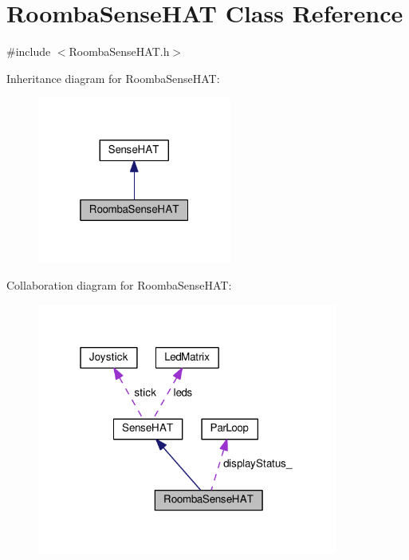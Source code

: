 \hypertarget{class_roomba_sense_h_a_t}{}\section{Roomba\+Sense\+H\+AT Class Reference}
\label{class_roomba_sense_h_a_t}


{\ttfamily \#include $<$Roomba\+Sense\+H\+A\+T.\+h$>$}



Inheritance diagram for Roomba\+Sense\+H\+AT\+:\nopagebreak
\begin{figure}[H]
\begin{center}
\leavevmode
\includegraphics[width=181pt]{class_roomba_sense_h_a_t__inherit__graph}
\end{center}
\end{figure}


Collaboration diagram for Roomba\+Sense\+H\+AT\+:\nopagebreak
\begin{figure}[H]
\begin{center}
\leavevmode
\includegraphics[width=280pt]{class_roomba_sense_h_a_t__coll__graph}
\end{center}
\end{figure}
